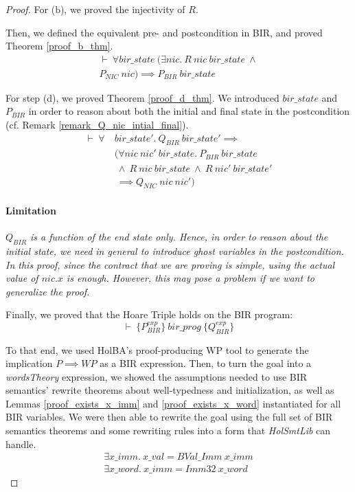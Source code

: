 \documentclass[10pt,a4paper]{article}
\newcommand{\htriple}[3]{\ensuremath{\{#1\}~#2~\{#3\}}}
\begin{document}
\begin{multicols}{2}
\begin{proof}
For (b), we proved the injectivity of $R$.

Then, we defined the equivalent pre- and postcondition in BIR, and proved Theorem \ref{proof_b_thm}.
%
\begin{equation} \label{proof_b_thm}
  \begin{split}
  \vdash~\forall bir\_state~(\exists nic.~R~nic~bir\_state~\land\\
  P_{NIC}~nic) \implies P_{BIR}~bir\_state
  \end{split}
\end{equation}

For step (d), we proved Theorem \ref{proof_d_thm}. We introduced $bir\_state$ and $P_{BIR}$ in order to reason about both the initial and final state in the postcondition (cf. Remark \ref{remark_Q_nic_intial_final}).
%
\begin{equation} \label{proof_d_thm}
\begin{split}
\vdash~\forall~&bir\_state'.~Q_{BIR}~bir\_state' \implies\\
	&(\forall nic~nic'~bir\_state.~P_{BIR}~bir\_state\\
	&~\land~R~nic~bir\_state~\land~R~nic'~bir\_state'\\
	&~\implies Q_{NIC}~nic~nic')
\end{split}
\end{equation}
\paragraph{Limitation} \textit{$Q_{BIR}$ is a function of the end state only. Hence, in order to reason about the initial state, we need in general to introduce ghost variables in the postcondition. In this proof, since the contract that we are proving is simple, using the actual value of $nic.x$ is enough. However, this may pose a problem if we want to generalize the proof.}
\medskip

Finally, we proved that the Hoare Triple holds on the BIR program:
%
\begin{equation} \label{proof_ht_thm}
\vdash~\htriple{P^{exp}_{BIR}}{bir\_prog}{Q^{exp}_{BIR}}
\end{equation}

To that end, we used HolBA's proof-producing WP tool to generate the implication $P \implies WP$ as a BIR expression. Then, to turn the goal into a \textit{wordsTheory} expression, we showed the assumptions needed to use BIR semantics' rewrite theorems about well-typedness and initialization, as well as Lemmas \ref{proof_exists_x_imm} and \ref{proof_exists_x_word} instantiated for all BIR variables. We were then able to rewrite the goal using the full set of BIR semantics theorems and some rewriting rules into a form that \textit{HolSmtLib} can handle.
%
\begin{align}
  \label{proof_exists_x_imm}
  \exists x\_imm.~x\_val = BVal\_Imm~x\_imm\\
  \label{proof_exists_x_word}
  \exists x\_word.~x\_imm = Imm32~x\_word
\end{align}


\end{proof}
\end{multicols}
\end{document}
